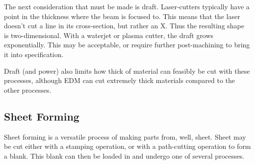 \documentclass[10pt,letterpaper]{book}
\begin{document}
  The next consideration that must be made is draft. Laser-cutters typically have a point in the thickness where the beam is focused to. This means that the laser doesn't cut a line in its cross-section, but rather an X. Thus the resulting shape is two-dimensional. With a waterjet or plasma cutter, the draft grows exponentially. This may be acceptable, or require further post-machining to bring it into specification.
 
 Draft (and power) also limits how thick of material can feasibly be cut with these processes, although EDM can cut extremely thick materials compared to the other processes.
 
 \subsection{Sheet Forming}
 
 Sheet forming is a versatile process of making parts from, well, sheet. Sheet may be cut either with a stamping operation, or with a path-cutting operation to form a blank. This blank can then be loaded in and undergo one of several processes.
 
\end{document}
